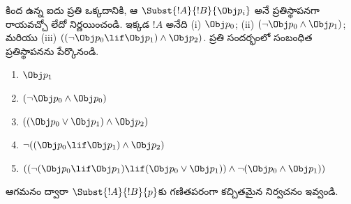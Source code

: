 \documentclass[../../../include/open-logic-section]{subfiles}
\begin{document}
\begin{prob} కింద ఉన్న ఐదు  ప్రతి ఒక్కదానికి, ఆ
  \( \Subst{!A}{!B}{\Obj p_i} \) అనే ప్రతిస్థాపనగా
 రాయవచ్చో లేదో నిర్ణయించండి. ఇక్కడ \( !A \) అనేది (i)
 \( \Obj p_0 \); (ii) \( ( \lnot \Obj p_0 \land \Obj
 p_1) \); మరియు (iii) \( ( ( \lnot \Obj p_0 \lif \Obj p_1 ) \land \Obj
 p_2 ) \). ప్రతి సందర్భంలో సంబంధిత ప్రతిస్థాపనను పేర్కొనండి.
  \begin{enumerate}
    \item \( \Obj p_1 \)
    \item \( ( \lnot \Obj p_0 \land \Obj p_0 ) \)
    \item \( ( ( \Obj p_0 \lor \Obj p_1 ) \land \Obj p_2 )  \)
    \item \( \lnot ( ( \Obj p_0 \lif \Obj p_1 ) \land \Obj p_2 ) \)
    \item \( (( \lnot ( \Obj p_0 \lif \Obj p_1 ) \lif ( \Obj p_0 \lor \Obj p_1 )) \land \lnot ( \Obj p_0 \land \Obj p_1 )) \)
  \end{enumerate}
\end{prob}

\begin{prob}
ఆగమనం ద్వారా $\Subst{!A}{!B}{p}$కు గణితపరంగా కచ్చితమైన నిర్వచనం
ఇవ్వండి.
\end{prob}
\end{document}
